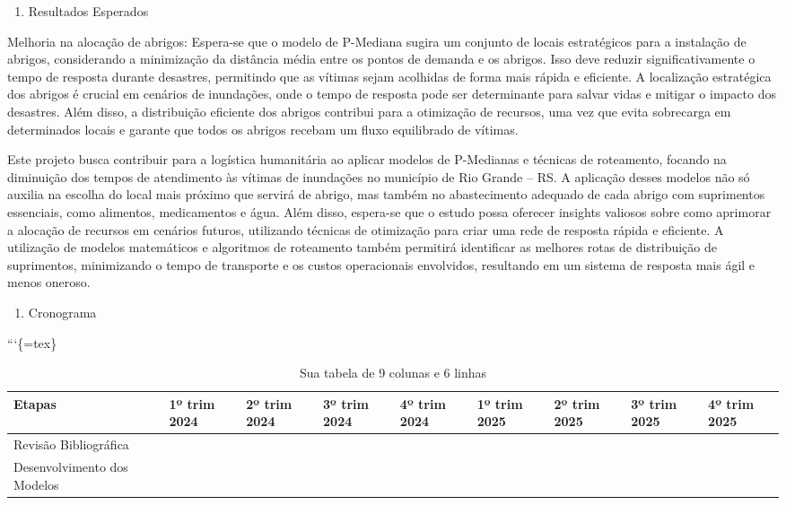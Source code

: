 \documentclass[
]{article}
\providecommand{\tightlist}{%
  \setlength{\itemsep}{0pt}\setlength{\parskip}{0pt}}
\begin{document}
\begin{enumerate}
\def\labelenumi{\arabic{enumi}.}
\setcounter{enumi}{4}
\tightlist
\item
  Resultados Esperados
\end{enumerate}

Melhoria na alocação de abrigos: Espera-se que o modelo de P-Mediana
sugira um conjunto de locais estratégicos para a instalação de abrigos,
considerando a minimização da distância média entre os pontos de demanda
e os abrigos. Isso deve reduzir significativamente o tempo de resposta
durante desastres, permitindo que as vítimas sejam acolhidas de forma
mais rápida e eficiente. A localização estratégica dos abrigos é crucial
em cenários de inundações, onde o tempo de resposta pode ser
determinante para salvar vidas e mitigar o impacto dos desastres. Além
disso, a distribuição eficiente dos abrigos contribui para a otimização
de recursos, uma vez que evita sobrecarga em determinados locais e
garante que todos os abrigos recebam um fluxo equilibrado de vítimas.

Este projeto busca contribuir para a logística humanitária ao aplicar
modelos de P-Medianas e técnicas de roteamento, focando na diminuição
dos tempos de atendimento às vítimas de inundações no município de Rio
Grande -- RS. A aplicação desses modelos não só auxilia na escolha do
local mais próximo que servirá de abrigo, mas também no abastecimento
adequado de cada abrigo com suprimentos essenciais, como alimentos,
medicamentos e água. Além disso, espera-se que o estudo possa oferecer
insights valiosos sobre como aprimorar a alocação de recursos em
cenários futuros, utilizando técnicas de otimização para criar uma rede
de resposta rápida e eficiente. A utilização de modelos matemáticos e
algoritmos de roteamento também permitirá identificar as melhores rotas
de distribuição de suprimentos, minimizando o tempo de transporte e os
custos operacionais envolvidos, resultando em um sistema de resposta
mais ágil e menos oneroso.

\begin{enumerate}
\def\labelenumi{\arabic{enumi}.}
\setcounter{enumi}{5}
\tightlist
\item
  Cronograma
\end{enumerate}

```\{=tex\}

\begin{table}[ht]
\centering
\begin{tabular}{|p{3cm}|p{1.5cm}|p{1.5cm}|p{1.5cm}|p{1.5cm}|p{1.5cm}|p{1.5cm}|p{1.5cm}|p{1.5cm}|}
\hline
Etapas & 1º trim 2024 & 2º trim 2024 & 3º trim 2024 & 4º trim 2024 & 1º trim 2025 & 2º trim 2025 & 3º trim 2025 & 4º trim 2025 \\ \hline
Revisão Bibliográfica   &    &    &    &    &    &    &    &    \\ \hline
Desenvolvimento dos Modelos &    &    &    &    &    &    &    &    \\ \hline
\end{tabular}
\caption{Sua tabela de 9 colunas e 6 linhas}
\end{table}
\end{document}
